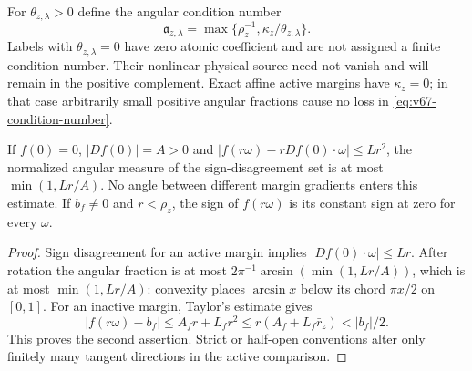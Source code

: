 For $\theta_{z,\lambda}>0$ define the angular condition number
\begin{equation}\label{eq:v67-condition-number}
 \mathfrak a_{z,\lambda}
       =\max\{\rho_z^{-1},\kappa_z/\theta_{z,\lambda}\}.
\end{equation}
Labels with $\theta_{z,\lambda}=0$ have zero atomic coefficient and
are not assigned a finite condition number. Their nonlinear physical
source need not vanish and will remain in the positive complement.
Exact affine active margins have $\kappa_z=0$; in that case arbitrarily
small positive angular fractions cause no loss in
\eqref{eq:v67-condition-number}.

\begin{lemma}
\label{lem:v67-homogeneous-threshold}
If $f(0)=0$, $|Df(0)|=A>0$ and
$|f(r\omega)-rDf(0)\cdot\omega|\le Lr^2$, the normalized angular
measure of the sign-disagreement set is at most
$\min(1,Lr/A)$. No angle between different margin gradients enters this
estimate. If $b_f\ne0$ and $r<\rho_z$, the sign of $f(r\omega)$ is
its constant sign at zero for every $\omega$.
\end{lemma}
\begin{proof}
Sign disagreement for an active margin implies
$|Df(0)\cdot\omega|\le Lr$. After rotation the angular fraction is
at most $2\pi^{-1}\arcsin(\min(1,Lr/A))$, which is at most
$\min(1,Lr/A)$: convexity places $\arcsin x$ below its chord
$\pi x/2$ on $[0,1]$. For an inactive margin, Taylor's estimate gives
\[
 |f(r\omega)-b_f|\le A_fr+L_fr^2
       \le r(A_f+L_f\bar r_z)<|b_f|/2.
\]
This proves the second assertion. Strict or half-open conventions
alter only finitely many tangent directions in the active comparison.
\end{proof}

